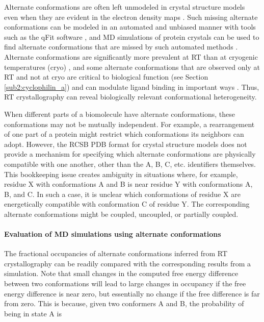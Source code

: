 \documentclass[9pt,review]{livecoms}
\begin{document}
Alternate conformations are often left unmodeled in crystal structure models even when they are evident in the electron density maps \cite{lang_automated_2010}.
Such missing alternate conformations can be modeled in an automated and unbiased manner with tools such as the qFit software \cite{riley_qfit_2021}, and MD simulations of protein crystals can be used to find alternate conformations that are missed by such automated methods \cite{wych_molecular-dynamics_2023}.
Alternate conformations are significantly more prevalent at RT than at cryogenic temperatures (cryo) \cite{fraser_accessing_2011}, and some alternate conformations that are observed only at RT and not at cryo are critical to biological function \cite{fraser_hidden_2009} (see Section \ref{sub2:cyclophilin_a}) and can modulate ligand binding in important ways \cite{cbradford_temperature_2021}.
Thus, RT crystallography can reveal biologically relevant conformational heterogeneity.

When different parts of a biomolecule have alternate conformations, these conformations may not be mutually independent.
For example, a rearrangement of one part of a protein might restrict which conformations its neighbors can adopt.
However, the RCSB PDB format for crystal structure models does not provide a mechanism for specifying which alternate conformations are physically compatible with one another, other than the A, B, C, etc. identifiers themselves.
This bookkeeping issue creates ambiguity in situations where, for example, residue X with conformations A and B is near residue Y with conformations A, B, and C.
In such a case, it is unclear which conformations of residue X are energetically compatible with conformation C of residue Y.
The corresponding alternate conformations might be coupled, uncoupled, or partially coupled.

\paragraph{Evaluation of MD simulations using alternate conformations}

The fractional occupancies of alternate conformations inferred from RT crystallography can be readily compared with the corresponding results from a simulation.
Note that small changes in the computed free energy difference between two conformations will lead to large changes in occupancy if the free energy difference is near zero, but essentially no change if the free difference is far from zero.
This is because, given two conformers A and B, the probability of being in state A is
\end{document}

